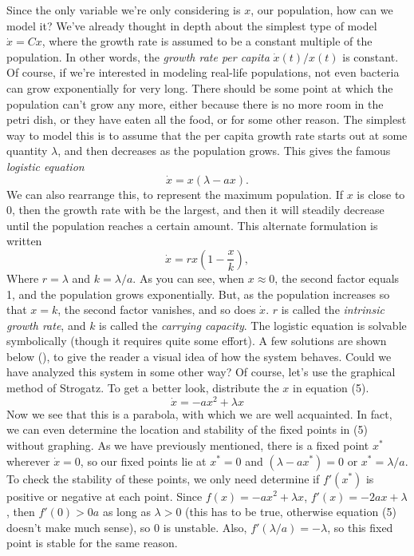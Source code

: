 \documentclass[man, 12pt]{apa6}
\newcommand{\citep}[1]{(\cite{#1})}
\begin{document}
Since the only variable we're only considering is $x$, our population, how can we model it? We've already thought in depth about the simplest type of model $\dot{x}=Cx$, where the growth rate is assumed to be a constant multiple of the population. In other words, the \emph{growth rate per capita} $\dot{x}(t)/{x}(t)$ is constant. Of course, if we're interested in modeling real-life populations, not even bacteria can grow exponentially for very long. There should be some point at which the population can't grow any more, either because there is no more room in the petri dish, or they have eaten all the food, or for some other reason. The simplest way to model this is to assume that the per capita growth rate starts out at some quantity $\lambda$, and then decreases as the population grows. This gives the famous \emph{logistic equation} 
\begin{equation}
\dot{x}=x(\lambda-ax).
\end{equation}
We can also rearrange this, to represent the maximum population. If $x$ is close to $0$, then the growth rate with be the largest, and then it will steadily decrease until the population reaches a certain amount. This alternate formulation is written 
\begin{equation}
\dot{x}=rx\left(1-\frac{x}{k}\right),
\end{equation}
Where $r=\lambda$ and $k=\lambda/a$. As you can see, when $x\approx0$, the second factor equals 1, and the population grows exponentially. But, as the population increases so that $x=k$, the second factor vanishes, and so does $\dot{x}$. $r$ is called the \emph{intrinsic growth rate}, and $k$ is called the \emph{carrying capacity}. The logistic equation is solvable symbolically (though it requires quite some effort). A few solutions are shown below \citep{brauer_2014}, to give the reader a visual idea of how the system behaves. 
Could we have analyzed this system in some other way? Of course, let's use the graphical method of Strogatz. To get a better look, distribute the $x$ in equation (5). 
$$\dot{x} =-ax^2+\lambda x$$
Now we see that this is a parabola, with which we are well acquainted. In fact, we can even determine the location and stability of the fixed points in (5) without graphing. As we have previously mentioned, there is a fixed point $x^*$ wherever $\dot{x}=0$, so our fixed points lie at 
$x^*=0$
and 
$(\lambda-ax^*)=0$
or $x^*=\lambda/a$. To check the stability of these points, we only need determine if $f'(x^*)$ is positive or negative at each point. Since $f(x)=-ax^2+\lambda x$, $f'(x)=-2ax+\lambda$, then $f'(0)>0a$ as long as $\lambda>0$ (this has to be true, otherwise equation (5) doesn't make much sense), so $0$ is unstable. Also, $f'(\lambda/a)=-\lambda$, so this fixed point is stable for the same reason. 
\end{document}
